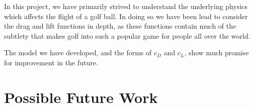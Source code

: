 In this project, we have primarily strived to understand the underlying physics which affects the flight
of a golf ball. In doing so we have been lead to consider the drag and lift functions in depth, as
these functions contain much of the subtlety that makes golf into such a popular game for people all
over the world.

The model we have developed, and the forms of $c_D$ and $c_L$, show much promise for improvement
in the future.

\section{Possible Future Work}